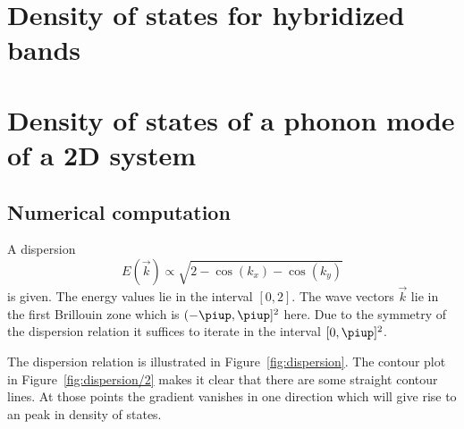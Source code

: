 \documentclass[11pt, english, fleqn, DIV=15, headinclude, BCOR=1cm]{scrartcl}
\begin{document}
\section{Density of states for hybridized bands}
\label{homework:2}

\section{Density of states of a phonon mode of a 2D system}
\label{homework:3}

\subsection{Numerical computation}

A dispersion
\[
    E(\vec k) \propto \sqrt{2 - \cos(k_x) - \cos(k_y)}
\]
is given. The energy values lie in the interval $[0, 2]$. The wave vectors
$\vec k$ lie in the first Brillouin zone which is $(-\piup, \piup]^2$ here. Due
to the symmetry of the dispersion relation it suffices to iterate in the
interval $[0, \piup]^2$.

The dispersion relation is illustrated in Figure~\ref{fig:dispersion}. The
contour plot in Figure~\ref{fig:dispersion/2} makes it clear that there are
some straight contour lines. At those points the gradient vanishes in one
direction which will give rise to an peak in density of states.
\end{document}
